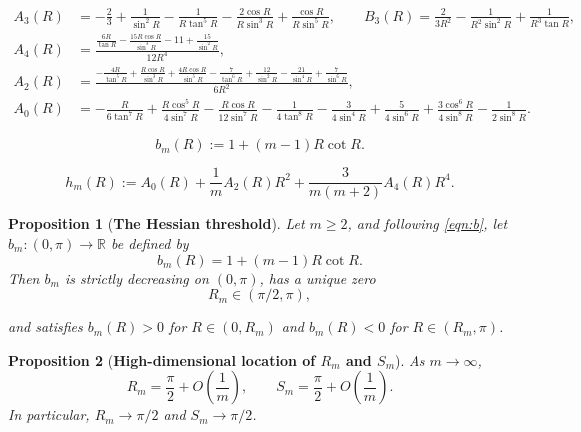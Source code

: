 \documentclass[10pt,a4paper]{amsart}
\newtheorem{proposition}{Proposition}
\begin{document}
\begin{equation}\label{eqn:A-B}
\boxed{
\begin{aligned}
A_{3}(R)&= - \frac{2}{3} + \frac{1}{\sin^{2} R} - \frac{1}{R \tan^{5} R}
- \frac{2\cos R}{R \sin^{3} R} + \frac{\cos R}{R \sin^{5} R},
\qquad
B_{3}(R)= \frac{2}{3 R^{2}} - \frac{1}{R^{2}\sin^{2} R} + \frac{1}{R^{3}\tan R},\\
A_{4}(R)&=\frac{\frac{6 R}{\tan R} - \frac{15 R \cos R}{\sin^{3} R} - 11 + \frac{15}{\sin^{2} R}}{12 R^{4}},\\
A_{2}(R)&=\frac{- \frac{4 R}{\tan^{5} R} + \frac{R \cos R}{\sin^{3} R} + \frac{4 R \cos R}{\sin^{5} R}
- \frac{7}{\tan^{6} R} + \frac{12}{\sin^{2} R} - \frac{21}{\sin^{4} R} + \frac{7}{\sin^{6} R}}{6 R^{2}},\\
A_{0}(R)&=
- \frac{R}{6 \tan^{7} R} + \frac{R \cos^{5} R}{4 \sin^{7} R} - \frac{R \cos R}{12 \sin^{7} R}
- \frac{1}{4 \tan^{8} R} - \frac{3}{4 \sin^{4} R} + \frac{5}{4 \sin^{6} R}
+ \frac{3 \cos^{6} R}{4 \sin^{8} R} - \frac{1}{2 \sin^{8} R}.
\end{aligned}
}
\end{equation}

\begin{equation}\label{eqn:b}
    b_m(R):=1+(m-1)R\cot R .
\end{equation}

\begin{equation}
\label{eqn:h}
    h_m(R):=
    A_0(R)+\frac{1}{m}A_2(R)R^2+\frac{3}{m(m+2)}A_4(R)R^4 .
\end{equation}

\begin{proposition}[\textbf{The Hessian threshold}]
\label{prop:zero_bm}
Let \(m\ge2\), and following \eqref{eqn:b}, let \(b_m:(0,\pi)\to\mathbb R\) be defined by
\[
    b_m(R)=1+(m-1)R\cot R.
\]
Then \(b_m\) is strictly decreasing on \((0,\pi)\), has a unique zero
\begin{equation}\label{eqn:R_m}
    \boxed{R_m\in(\pi/2,\pi),}
\end{equation}
    

and satisfies \(b_m(R)>0\) for \(R\in(0,R_m)\) and \(b_m(R)<0\) for \(R\in(R_m,\pi)\).
\end{proposition}

\begin{proposition}[\textbf{High-dimensional location of \(R_m\) and \(S_m\)}]
\label{prop:asymptotics-Rm-Sm}
\label{prop:asymp-first-zero-h_m}
As \(m\to\infty\),
\[
R_m=\frac{\pi}{2}+O\!\left(\frac{1}{m}\right),
\qquad
S_m=\frac{\pi}{2}+O\!\left(\frac{1}{m}\right).
\]
In particular, \(R_m\to\pi/2\) and \(S_m\to\pi/2\).
\end{proposition}
\end{document}
